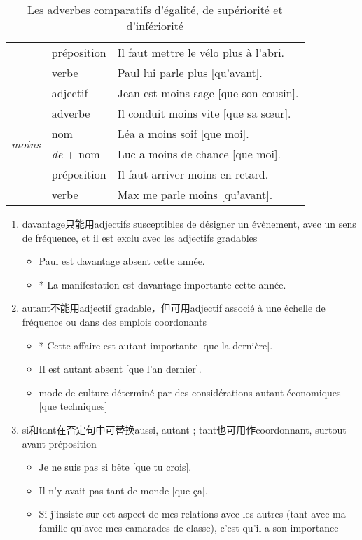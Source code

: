 \documentclass[UTF8]{report}
\begin{document}
\begin{table}[H]
\begin{adjustbox}{max width=\textwidth}
\begin{tabular}{|p{3cm}|p{3.5cm}|p{8.5cm}|}
    & préposition & Il faut mettre le vélo plus à l'abri. \\
    & verbe & Paul lui parle plus [qu'avant]. \\
    \hline
    \multirow{6}{*}{\textit{moins}} & adjectif & Jean est moins sage [que son cousin]. \\
    & adverbe & Il conduit moins vite [que sa sœur]. \\
    & nom & Léa a moins soif [que moi]. \\
    & \textit{de} + nom & Luc a moins de chance [que moi]. \\
    & préposition & Il faut arriver moins en retard. \\
    & verbe & Max me parle moins [qu'avant]. \\
    \hline
    \end{tabular}
\end{adjustbox}
\caption{Les adverbes comparatifs d’égalité, de supériorité et d’infériorité}
\end{table}

\begin{enumerate}
    \item davantage只能用adjectifs susceptibles de désigner un évènement, avec un sens de fréquence, et il est exclu avec les adjectifs gradables
    \begin{itemize}
        \item Paul est davantage absent cette année.
        \item * La manifestation est davantage importante cette année.
    \end{itemize}
    \item autant不能用adjectif gradable，但可用adjectif associé à une échelle de fréquence ou dans des emplois coordonants
    \begin{itemize}
        \item * Cette affaire est autant importante [que la dernière].
        \item Il est autant absent [que l’an dernier].
        \item mode de culture déterminé par des considérations autant économiques [que techniques] 
    \end{itemize}
    \item si和tant在否定句中可替换aussi, autant ; tant也可用作coordonnant, surtout avant préposition
    \begin{itemize}
        \item Je ne suis pas si bête [que tu crois].
        \item Il n’y avait pas tant de monde [que ça].
        \item Si j’insiste sur cet aspect de mes relations avec les autres (tant avec ma famille qu’avec mes camarades de classe), c’est qu’il a son importance
    \end{itemize}
\end{enumerate}
\end{document}
